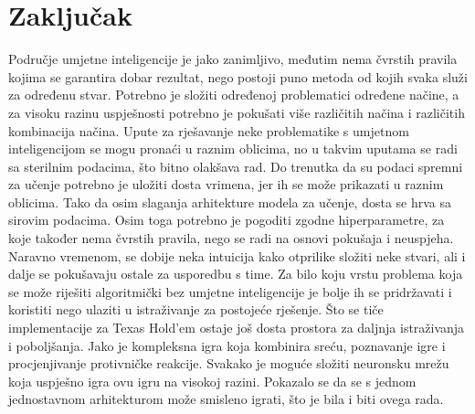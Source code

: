 \section{Zaključak}
Područje umjetne inteligencije je jako zanimljivo, međutim nema čvrstih pravila kojima se garantira dobar rezultat, nego postoji puno metoda od kojih svaka služi za određenu stvar. Potrebno je složiti određenoj problematici određene načine, a za visoku razinu uspješnosti potrebno je pokušati više različitih načina i različitih kombinacija načina. Upute za rješavanje neke problematike s umjetnom inteligencijom se mogu pronaći u raznim oblicima, no u takvim uputama se radi sa sterilnim podacima, što bitno olakšava rad. Do trenutka da su podaci spremni za učenje potrebno je uložiti dosta vrimena, jer ih se može prikazati u raznim oblicima. Tako da osim slaganja arhitekture modela za učenje, dosta se hrva sa sirovim podacima. Osim toga potrebno je pogoditi zgodne hiperparametre, za koje također nema čvrstih pravila, nego se radi na osnovi pokušaja i neuspjeha. Naravno vremenom, se dobije neka intuicija kako otprilike složiti neke stvari, ali i dalje se pokušavaju ostale za usporedbu s time. Za bilo koju vrstu problema koja se može riješiti algoritmički bez umjetne inteligencije je bolje ih se pridržavati i koristiti nego ulaziti u istraživanje za postojeće rješenje. Što se tiče implementacije za Texas Hold'em ostaje još dosta prostora za daljnja istraživanja i poboljšanja. Jako je kompleksna igra koja kombinira sreću, poznavanje igre i procjenjivanje protivničke reakcije. Svakako je moguće složiti neuronsku mrežu koja uspješno igra ovu igru na visokoj razini. Pokazalo se da se s jednom jednostavnom arhitekturom može smisleno igrati, što je bila i biti ovega rada.